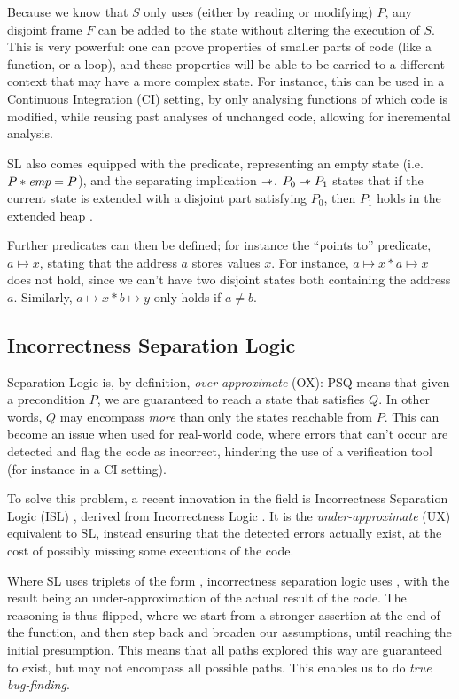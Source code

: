 Because we know that $S$ only uses (either by reading or modifying) $P$, any disjoint frame $F$ can be added to the state without altering the execution of $S$. This is very powerful: one can prove properties of smaller parts of code (like a function, or a loop), and these properties will be able to be carried to a different context that may have a more complex state. For instance, this can be used in a Continuous Integration (CI) setting, by only analysing functions of which code is modified, while reusing past analyses of unchanged code, allowing for incremental analysis.

SL also comes equipped with the \emp{} predicate, representing an empty state (i.e. ${P * \textit{emp} = P}$), and the separating implication $\mathrel{-\!\!\ast}$. $P_0 \mathrel{-\!\!\ast} P_1$ states that if the current state is extended with a disjoint part satisfying $P_0$, then $P_1$ holds in the extended heap \cite{seplogic2}.

Further predicates can then be defined; for instance the ``points to'' predicate, $a \mapsto x$, stating that the address $a$ stores values $x$. For instance, $a \mapsto x * a \mapsto x$ does not hold, since we can't have two disjoint states both containing the address $a$. Similarly, $a\mapsto x * b \mapsto y$ only holds if $a\neq b$.

\subsection{Incorrectness Separation Logic}

Separation Logic is, by definition, \emph{over-approximate} (OX): \SLtriple PSQ means that given a precondition $P$, we are guaranteed to reach a state that satisfies $Q$. In other words, $Q$ may encompass \emph{more} than only the states reachable from $P$. This can become an issue when used for real-world code, where errors that can't occur are detected and flag the code as incorrect, hindering the use of a verification tool (for instance in a CI setting).

To solve this problem, a recent innovation in the field is Incorrectness Separation Logic (ISL) \cite{isl}, derived from Incorrectness Logic \cite{incorrectnesslogic}. It is the \emph{under-approximate} (UX) equivalent to SL, instead ensuring that the detected errors actually exist, at the cost of possibly missing some executions of the code.

Where SL uses triplets of the form , incorrectness separation logic uses , with the result being an under-approximation of the actual result of the code. The reasoning is thus flipped, where we start from a stronger assertion at the end of the function, and then step back and broaden our assumptions, until reaching the initial presumption. This means that all paths explored this way are guaranteed to exist, but may not encompass all possible paths. This enables us to do \emph{true bug-finding}.

